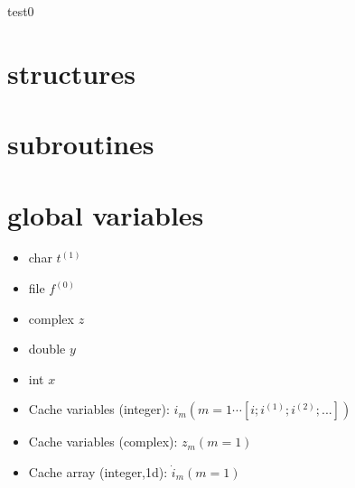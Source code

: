 \documentclass[a4paper,fleqn]{ltjsarticle}
\begin{document}
{\Large test0}
\section{structures}
\section{subroutines}
\section{global variables}
\begin{itemize}
\item char $t^{(1)}$
\item file $f^{(0)}$
\item complex $z$
\item double $y$
\item int $x$
\item Cache variables (integer): \(i_m (m = 1 \cdots [i; i^{(1)}; i^{(2)}; ... ])\)
\item Cache variables (complex): \(z_m (m = 1)\)
\item Cache array (integer,1d): \(\dot{i}_m (m = 1)\)
\end{itemize}
\end{document}
